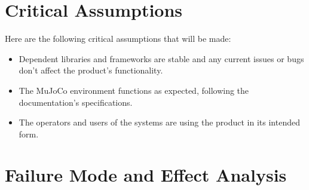 \documentclass{article}
\begin{document}
\section{Critical Assumptions}


Here are the following critical assumptions that will be made: 

\begin{itemize}
    \item Dependent libraries and frameworks are stable and any current issues or bugs don't affect the product's functionality.
    \item The MuJoCo environment functions as expected, following the documentation's specifications.
    \item The operators and users of the systems are using the product in its intended form.
\end{itemize}

\section{Failure Mode and Effect Analysis}
\end{document}
